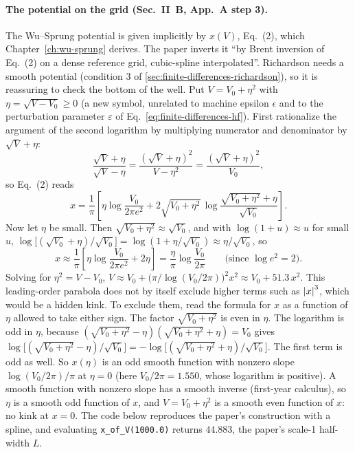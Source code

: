 \paragraph{The potential on the grid (Sec.~II~B, App.~A step 3).} The Wu--Sprung potential is given implicitly by $x(V)$, Eq.~(2), which Chapter~\ref{ch:wu-sprung} derives. The paper inverts it ``by Brent inversion of Eq.~(2) on a dense reference grid, cubic-spline interpolated''. Richardson needs a smooth potential (condition 3 of \cref{sec:finite-differences-richardson}), so it is reassuring to check the bottom of the well. Put $V=V_0+\eta^2$ with $\eta=\sqrt{V-V_0}\ge0$ (a new symbol, unrelated to machine epsilon $\epsilon$ and to the perturbation parameter $\varepsilon$ of Eq.~\eqref{eq:finite-differences-hf}). First rationalize the argument of the second logarithm by multiplying numerator and denominator by $\sqrt V+\eta$:
\begin{equation*}
\frac{\sqrt V+\eta}{\sqrt V-\eta}=\frac{(\sqrt V+\eta)^2}{V-\eta^2}=\frac{(\sqrt V+\eta)^2}{V_0},
\end{equation*}
so Eq.~(2) reads
\begin{equation*}
x=\frac1\pi\left[\eta\log\frac{V_0}{2\pi e^2}+2\sqrt{V_0+\eta^2}\,\log\frac{\sqrt{V_0+\eta^2}+\eta}{\sqrt{V_0}}\right].
\end{equation*}
Now let $\eta$ be small. Then $\sqrt{V_0+\eta^2}\approx\sqrt{V_0}$, and with $\log(1+u)\approx u$ for small $u$, $\log\big[(\sqrt{V_0}+\eta)/\sqrt{V_0}\big]=\log(1+\eta/\sqrt{V_0})\approx\eta/\sqrt{V_0}$, so
\begin{equation*}
x\approx\frac1\pi\left[\eta\log\frac{V_0}{2\pi e^2}+2\eta\right]=\frac{\eta}{\pi}\log\frac{V_0}{2\pi}\qquad\text{(since }\log e^2=2\text{)}.
\end{equation*}
Solving for $\eta^2=V-V_0$, $V\approx V_0+\big(\pi/\log(V_0/2\pi)\big)^2x^2\approx V_0+51.3\,x^2$. This leading-order parabola does not by itself exclude higher terms such as $\left\lvert x\right\rvert^3$, which would be a hidden kink. To exclude them, read the formula for $x$ as a function of $\eta$ allowed to take either sign. The factor $\sqrt{V_0+\eta^2}$ is even in $\eta$. The logarithm is odd in $\eta$, because $(\sqrt{V_0+\eta^2}-\eta)(\sqrt{V_0+\eta^2}+\eta)=V_0$ gives $\log\big[(\sqrt{V_0+\eta^2}-\eta)/\sqrt{V_0}\big]=-\log\big[(\sqrt{V_0+\eta^2}+\eta)/\sqrt{V_0}\big]$. The first term is odd as well. So $x(\eta)$ is an odd smooth function with nonzero slope $\log(V_0/2\pi)/\pi$ at $\eta=0$ (here $V_0/2\pi=1.550$, whose logarithm is positive). A smooth function with nonzero slope has a smooth inverse (first-year calculus), so $\eta$ is a smooth odd function of $x$, and $V=V_0+\eta^2$ is a smooth even function of $x$: no kink at $x=0$. The code below reproduces the paper's construction with a spline, and evaluating \texttt{x\_of\_V(1000.0)} returns $44.883$, the paper's scale-1 half-width $L$.

